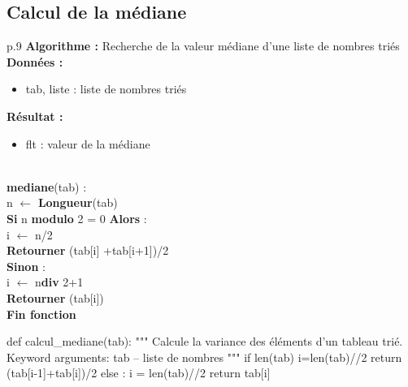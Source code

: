 \documentclass[10pt]{article}
\begin{document}
\subsection{Calcul de la médiane} %


\begin{minipage}[c]{.48\linewidth}
\begin{pseudo}
\begin{center}
\begin{tabular}{p{.9\textwidth}}
\hline
\textbf{Algorithme :} Recherche de la valeur médiane d'une liste de nombres triés \\
\hline
\textbf{Données :}
\begin{itemize}
\item \textsf{tab}, liste : liste de nombres triés
\end{itemize}
\textbf{Résultat :} 
\begin{itemize}
\item flt : valeur de la médiane
\end{itemize}
\\
\textbf{mediane}(\textsf{tab}) :\\
\hspace{.4cm}\textsf{n} $\leftarrow$ \textbf{Longueur}\textsf{(tab)} \\
\hspace{.4cm}\textbf{Si} \textsf{n} \textbf{modulo} \textsf{2 = 0} \textbf{Alors} : \\
\hspace{.8cm} \textsf{i $\leftarrow$ n/2} \\
\hspace{.8cm} \textbf{Retourner} \textsf{(tab[i] +tab[i+1])/2} \\
\hspace{.4cm}\textbf{Sinon} :\\
\hspace{.8cm} \textsf{i $\leftarrow$ n}\textbf{div} \textsf{2+1} \\
\hspace{.8cm} \textbf{Retourner} \textsf{(tab[i])} \\
\textbf{Fin fonction} \\
\hline
\end{tabular}
\end{center}
\end{pseudo}
\end{minipage} \hfill
\begin{minipage}[c]{.48\linewidth}
\begin{py}
\begin{python}
def calcul_mediane(tab):
    """ 
    Calcule la variance des éléments d'un tableau trié.
    Keyword arguments:
    tab -- liste de nombres
    """
    if len(tab)%
        i=len(tab)//2
        return (tab[i-1]+tab[i])/2
    else :
        i = len(tab)//2
    return tab[i]
\end{python}
\end{py}
\end{minipage}
\end{document}
